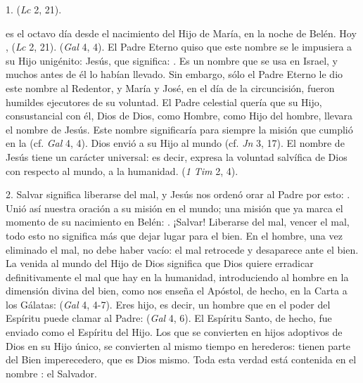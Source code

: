 \begin{body}
	1.  (\emph{Lc} 2, 21). 
	
	 es el octavo día desde el nacimiento del Hijo de María, en la noche de Belén. Hoy ,  (\emph{Lc} 2, 21).  (\emph{Gal} 4, 4). El Padre Eterno quiso que este nombre se le impusiera a su Hijo unigénito: Jesús, que significa: . Es un nombre que se usa en Israel, y muchos antes de él lo habían llevado. Sin embargo, sólo el Padre Eterno le dio este nombre al Redentor, y María y José, en el día de la circuncisión, fueron humildes ejecutores de su voluntad. El Padre celestial quería que su Hijo, consustancial con él, Dios de Dios, como Hombre, como Hijo del hombre, llevara el nombre de Jesús. Este nombre significaría para siempre la misión que cumplió en la  (cf. \emph{Gal} 4, 4). Dios envió a su Hijo al mundo  (cf. \emph{Jn} 3, 17). El nombre de Jesús tiene un carácter universal: es decir, expresa la voluntad salvífica de Dios con respecto al mundo, a la humanidad.  (\emph{1 Tim} 2, 4).
	
	2. Salvar significa liberarse del mal, y Jesús nos ordenó orar al Padre por esto: . Unió así nuestra oración a su misión en el mundo; una misión que ya marca el momento de su nacimiento en Belén: . ¡Salvar! Liberarse del mal, vencer el mal, todo esto no significa más que dejar lugar para el bien. En el hombre, una vez eliminado el mal, no debe haber vacío: el mal retrocede y desaparece ante el bien. La venida al mundo del Hijo de Dios significa que Dios quiere erradicar definitivamente el mal que hay en la humanidad, introduciendo al hombre en la dimensión divina del bien, como nos enseña el Apóstol, de hecho, en la Carta a los Gálatas:  (\emph{Gal} 4, 4-7). Eres hijo, es decir, un hombre que en el poder del Espíritu puede clamar al Padre:  (\emph{Gal} 4, 6). El Espíritu Santo, de hecho, fue enviado como el Espíritu del Hijo. Los que se convierten en hijos adoptivos de Dios en su Hijo único, se convierten al mismo tiempo en herederos: tienen parte del Bien imperecedero, que es Dios mismo. Toda esta verdad está contenida en el nombre : el Salvador.
	

\end{body}
